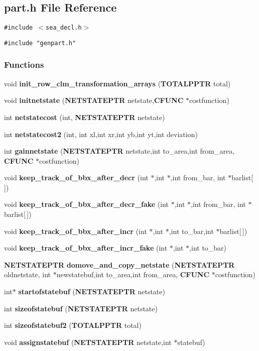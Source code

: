 \subsection{part.h File Reference}
\label{part.h}
{\tt \#include $<$sea\_\-decl.h$>$}\par
{\tt \#include "genpart.h"}\par
\subsubsection*{Functions}
\begin{CompactItemize}
\item 
void {\bf init\_\-row\_\-clm\_\-transformation\_\-arrays} ({\bf TOTALPPTR} total)
\item 
void {\bf initnetstate} ({\bf NETSTATEPTR} netstate,{\bf CFUNC} $\ast$costfunction)
\item 
int {\bf netstatecost} (int, {\bf NETSTATEPTR} netstate)
\item 
int {\bf netstatecost2} (int, int xl,int xr,int yb,int yt,int deviation)
\item 
int {\bf gainnetstate} ({\bf NETSTATEPTR} netstate,int to\_\-area,int from\_\-area, {\bf CFUNC} $\ast$costfunction)
\item 
void {\bf keep\_\-track\_\-of\_\-bbx\_\-after\_\-decr} (int $\ast$,int $\ast$,int from\_\-bar, int $\ast$barlist[$\,$])
\item 
void {\bf keep\_\-track\_\-of\_\-bbx\_\-after\_\-decr\_\-fake} (int $\ast$,int $\ast$,int from\_\-bar, int $\ast$barlist[$\,$])
\item 
void {\bf keep\_\-track\_\-of\_\-bbx\_\-after\_\-incr} (int $\ast$,int $\ast$,int to\_\-bar,int $\ast$barlist[$\,$])
\item 
void {\bf keep\_\-track\_\-of\_\-bbx\_\-after\_\-incr\_\-fake} (int $\ast$,int $\ast$,int to\_\-bar)
\item 
{\bf NETSTATEPTR} {\bf domove\_\-and\_\-copy\_\-netstate} ({\bf NETSTATEPTR} oldnetstate, int $\ast$newstatebuf,int to\_\-area,int from\_\-area, {\bf CFUNC} $\ast$costfunction)
\item 
int$\ast$ {\bf startofstatebuf} ({\bf NETSTATEPTR} netstate)
\item 
int {\bf sizeofstatebuf} ({\bf NETSTATEPTR} netstate)
\item 
int {\bf sizeofstatebuf2} ({\bf TOTALPPTR} total)
\item 
void {\bf assignstatebuf} ({\bf NETSTATEPTR} netstate,int $\ast$statebuf)
\item 

\end{CompactItemize}
